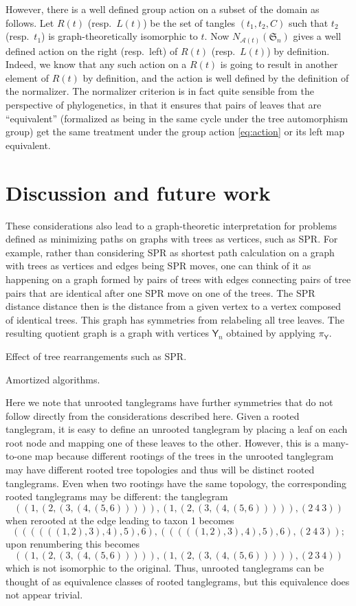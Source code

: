\documentclass{amsart}
\newcommand{\fS}{\mathfrak S}
\newcommand{\aut}{\mathcal A}
\newcommand{\tangle}{\mathsf{Y}}
\begin{document}
However, there is a well defined group action on a subset of the domain as follows.
Let $R(t)$ (resp.\ $L(t)$) be the set of tangles $(t_1, t_2, C)$ such that $t_2$ (resp.\ $t_1$) is graph-theoretically isomorphic to $t$.
Now $N_{\aut(t)}(\fS_n)$ gives a well defined action on the right (resp.\ left) of $R(t)$ (resp.\ $L(t)$) by definition.
Indeed, we know that any such action on a $R(t)$ is going to result in another element of $R(t)$ by definition, and the action is well defined by the definition of the normalizer.
The normalizer criterion is in fact quite sensible from the perspective of phylogenetics, in that it ensures that pairs of leaves that are ``equivalent'' (formalized as being in the same cycle under the tree automorphism group) get the same treatment under the group action \eqref{eq:action} or its left map equivalent.


\section{Discussion and future work}
These considerations also lead to a graph-theoretic interpretation for problems defined as minimizing paths on graphs with trees as vertices, such as SPR.
For example, rather than considering SPR as shortest path calculation on a graph with trees as vertices and edges being SPR moves, one can think of it as happening on a graph formed by pairs of trees with edges connecting pairs of tree pairs that are identical after one SPR move on one of the trees.
The SPR distance distance then is the distance from a given vertex to a vertex composed of identical trees.
This graph has symmetries from relabeling all tree leaves.
The resulting quotient graph is a graph with vertices $\tangle_n$ obtained by applying $\pi_\tangle$.

Effect of tree rearrangements such as SPR.

Amortized algorithms.

Here we note that unrooted tanglegrams have further symmetries that do not follow directly from the considerations described here.
Given a rooted tanglegram, it is easy to define an unrooted tanglegram by placing a leaf on each root node and mapping one of these leaves to the other.
However, this is a many-to-one map because different rootings of the trees in the unrooted tanglegram may have different rooted tree topologies and thus will be distinct rooted tanglegrams.
Even when two rootings have the same topology, the corresponding rooted tanglegrams may be different:
the tanglegram
$$((1,(2,(3,(4,(5,6))))), (1,(2,(3,(4,(5,6))))), (2\ 4\ 3))$$
when rerooted at the edge leading to taxon 1 becomes
$$((((((1,2),3),4),5),6), (((((1,2),3),4),5),6), (2\ 4\ 3));$$
upon renumbering this becomes
$$((1,(2,(3,(4,(5,6))))), (1,(2,(3,(4,(5,6))))), (2\ 3\ 4))$$
which is not isomorphic to the original.
Thus, unrooted tanglegrams can be thought of as equivalence classes of rooted tanglegrams, but this equivalence does not appear trivial.
\end{document}
